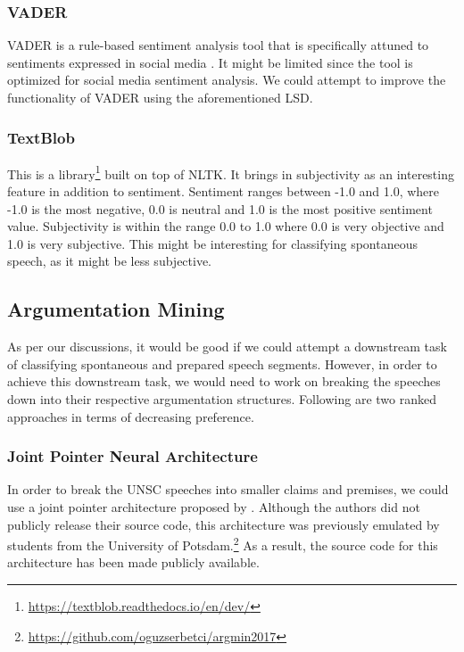 \documentclass[12pt,a4paper]{article}
\begin{document}
\subsubsection{VADER} VADER is a rule-based sentiment analysis tool that is
specifically attuned to sentiments expressed in social media \citep{vader}. It
might be limited since the tool is optimized for social media sentiment
analysis. We could attempt to improve the functionality of VADER using the
aforementioned LSD.

\subsubsection{TextBlob}

This is a library\footnote{\url{https://textblob.readthedocs.io/en/dev/}} built
on top of NLTK. It brings in subjectivity as an interesting feature in addition
to sentiment. Sentiment ranges between -1.0 and 1.0, where -1.0 is the most
negative, 0.0 is neutral and 1.0 is the most positive sentiment value.
Subjectivity is within the range 0.0 to 1.0 where 0.0 is very objective and 1.0
is very subjective. This might be interesting for classifying spontaneous
speech, as it might be less subjective.

\clearpage
\subsection{Argumentation Mining}

As per our discussions, it would be good if we could attempt a downstream task
of classifying spontaneous and prepared speech segments. However, in order to
achieve this downstream task, we would need to work on breaking the speeches
down into their respective argumentation structures. Following are two ranked
approaches in terms of decreasing preference.

\subsubsection{Joint Pointer Neural Architecture}

In order to break the UNSC speeches into smaller claims and premises, we could
use a joint pointer architecture proposed by \citet{potash2016heres}. Although
the authors did not publicly release their source code, this architecture was
previously emulated by students from the University of
Potsdam.\footnote{\url{https://github.com/oguzserbetci/argmin2017}} As a result,
the source code for this architecture has been made publicly available.
\end{document}
